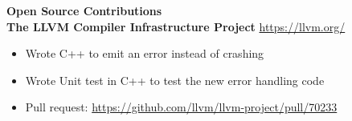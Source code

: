 \documentclass[10pt]{article}
\begin{document}
{\Large\textbf{Open Source Contributions}}\space \hrulefill
\\
\textbf{The LLVM Compiler Infrastructure Project } \hfill \url{https://llvm.org/}
\begin{itemize}[noitemsep]
    \item Wrote C++ to emit an error instead of crashing 
    \item Wrote Unit test in C++ to test the new error handling code
    \item Pull request: \url{https://github.com/llvm/llvm-project/pull/70233}
\end{itemize}
\end{document}
